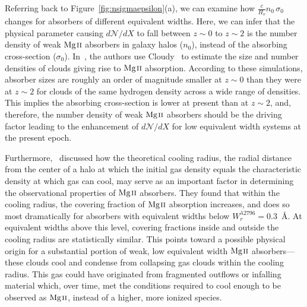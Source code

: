 \documentclass[iop,apj,numberedappendix,appendixfloats,twocolappendix]{emulateapj}
\begin{document}
Referring back to Figure~\ref{fig:nsigmaepsilon}(a), we can examine how $\frac{c}{H_o}n_0\,\sigma_0$ changes for absorbers of different equivalent widths. Here, we can infer that the physical parameter causing $d\mathcal{N}\!/dX$ to fall between $z \sim 0$ to $z \sim 2$ is the number density of weak ${\hbox{{\rm Mg}\kern 0.1em{\sc ii}}}$ absorbers in galaxy halos ($n_0$), instead of the absorbing cross-section ($\sigma_0$). In~\cite{Evans2013}, the authors use Cloudy~\citep{Ferland2013} to estimate the size and number densities of clouds giving rise to ${\hbox{{\rm Mg}\kern 0.1em{\sc ii}}}$ absorption. According to these simulations, absorber sizes are roughly an order of magnitude smaller at $z \sim 0$ than they were at $z \sim 2$ for clouds of the same hydrogen density across a wide range of densities. This implies the absorbing cross-section is lower at present than at $z \sim 2$, and, therefore, the number density of weak ${\hbox{{\rm Mg}\kern 0.1em{\sc ii}}}$ absorbers should be the driving factor leading to the enhancement of $d\mathcal{N}\!/dX$ for low equivalent width systems at the present epoch.

Furthermore,~\cite{MAGIICAT3} discussed how the theoretical cooling radius, the radial distance from the center of a halo at which the initial gas density equals the characteristic density at which gas can cool, may serve as an important factor in determining the observational properties of ${\hbox{{\rm Mg}\kern 0.1em{\sc ii}}}$ absorbers. They found that within the cooling radius, the covering fraction of ${\hbox{{\rm Mg}\kern 0.1em{\sc ii}}}$ absorption increases, and does so most dramatically for absorbers with equivalent widths below $W_r^{\lambda2796} = 0.3$~{\AA}. At equivalent widths above this level, covering fractions inside and outside the cooling radius are statistically similar. This points toward a possible physical origin for a substantial portion of weak, low equivalent width ${\hbox{{\rm Mg}\kern 0.1em{\sc ii}}}$ absorbers---these clouds cool and condense from collapsing gas clouds within the cooling radius. This gas could have originated from fragmented outflows or infalling material which, over time, met the conditions required to cool enough to be observed as ${\hbox{{\rm Mg}\kern 0.1em{\sc ii}}}$, instead of a higher, more ionized species.
\end{document}

